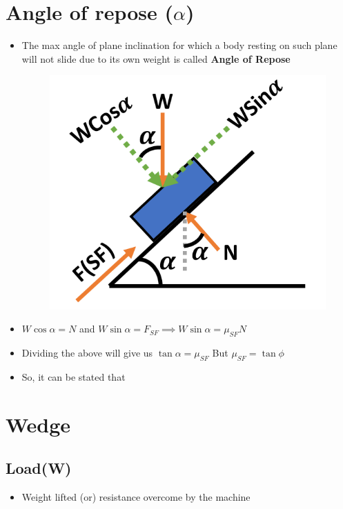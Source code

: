 \documentclass[8pt]{report}
\begin{document}
\section{Angle of repose ($\alpha$)}
	\begin{itemize}
		\item The max angle of plane inclination for which a body resting on such plane will not slide due to its own weight is called \textbf{Angle of Repose}
		\begin{figure}[H]
			\centering
			\includegraphics[scale=0.5]{angleofrepose.png}
		\end{figure}
		\item $W\cos\alpha=N$ and $W\sin\alpha=F_{SF}\implies W\sin\alpha=\mu_{SF}N$
		\item Dividing the above will give us $\tan\alpha=\mu_{SF}$ But $\mu_{SF}=\tan\phi$
		\item So, it can be stated that 
	\end{itemize}\hrulefill	
\section{Wedge}
\subsection{Load(W)}
	\begin{itemize}
		\item  Weight lifted (or) resistance overcome by the machine
	\end{itemize}
\end{document}
